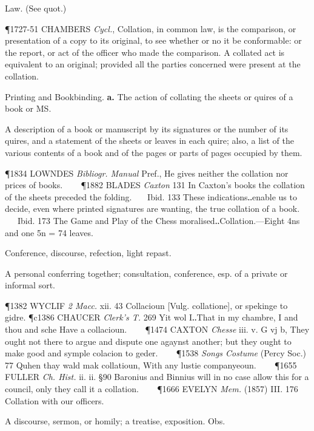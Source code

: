 \begin{description}[wide, labelwidth=!, labelindent=0pt]
\begin{myenumerate}
 Law. (See quot.)

\P 1727-51 CHAMBERS  \textit{Cycl.}, Collation, in common law, is the comparison, or presentation of a copy to its original, to see whether or no it be conformable: or the report, or act of the officer who made the comparison. A collated act is equivalent to an original; provided all the parties concerned were present at the collation.

 Printing and Bookbinding. \textbf{a.} The action of collating the sheets or quires of a book or MS.

 A description of a book or manuscript by its signatures or the number of its quires, and a statement of the sheets or leaves in each quire; also, a list of the various contents of a book and of the pages or parts of pages occupied by them.

\P 1834 LOWNDES  \textit{Bibliogr. Manual} Pref., He gives neither the collation nor prices of books.    
\P 1882 BLADES  \textit{Caxton} 131 In Caxton's books the collation of the sheets preceded the folding.    Ibid. 133 These indications‥enable us to decide, even where printed signatures are wanting, the true collation of a book.    Ibid. 173 The Game and Play of the Chess moralised‥Collation.—Eight 4ns and one 5n = 74 leaves.

 Conference, discourse, refection, light repast.

 A personal conferring together; consultation, conference, esp. of a private or informal sort.

\P 1382 WYCLIF  \textit{2 Macc.} xii. 43 Collacioun [Vulg. collatione], or spekinge to gidre.
\P c1386 CHAUCER  \textit{Clerk's T.} 269 Yit wol I‥That in my chambre, I and thou and sche Have a collacioun.    
\P 1474 CAXTON  \textit{Chesse} iii. v. G vj b, They ought not there to argue and dispute one agaynst another; but they ought to make good and symple colacion to geder.    
\P 1538 \textit{Songs  Costume} (Percy Soc.) 77 Quhen thay wald mak collatioun, With any lustie companyeoun.    
\P 1655 FULLER  \textit{Ch. Hist.} ii. ii. §90 Baronius and Binnius will in no case allow this for a council, only they call it a collation.    
\P 1666 EVELYN  \textit{Mem.} (1857) III. 176 Collation with our officers.

 A discourse, sermon, or homily; a treatise, exposition. Obs.


\end{myenumerate}
\end{description}
